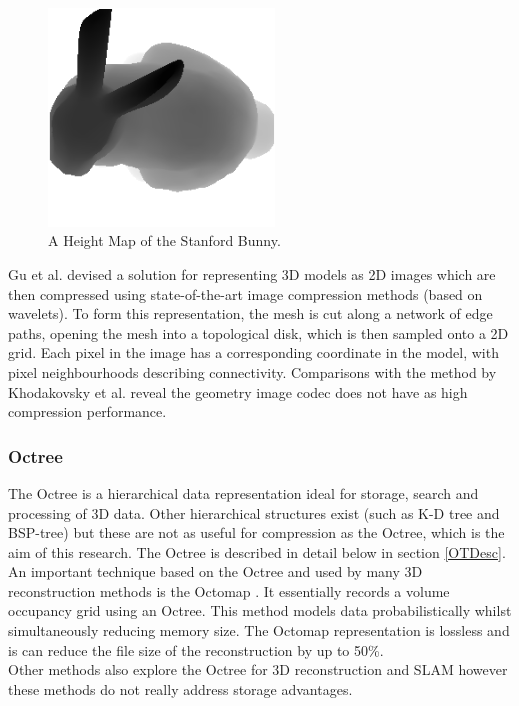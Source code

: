 \begin{figure}[!htb]
\centering
\includegraphics[width=6cm]{images/literature/HeightMap}
\caption{A Height Map of the Stanford Bunny.}
\label{fig:HeightMapExample}
\end{figure}

Gu et al. \cite{Gu02Geometry} devised a solution for representing 3D models as 2D images which are then compressed using state-of-the-art image compression methods (based on wavelets). To form this representation, the mesh is cut along a network of edge paths, opening the mesh into a topological disk, which is then sampled onto a 2D grid. Each pixel in the image has a corresponding coordinate in the model, with pixel neighbourhoods describing connectivity. Comparisons with the method by Khodakovsky et al. reveal the geometry image codec does not have as high compression performance. \\


\subsubsection{Octree}

The Octree is a hierarchical data representation ideal for storage, search and processing of 3D data. Other hierarchical structures exist (such as K-D tree and BSP-tree) \cite{Samet06Foundations} but these are not as useful for compression as the Octree, which is the aim of this research. The Octree is described in detail below in section \ref{OTDesc}. An important technique based on the Octree and used by many 3D reconstruction methods is the Octomap \cite{Wurm10Octomap}. It essentially records a volume occupancy grid using an Octree. This method models data probabilistically whilst simultaneously reducing memory size. The Octomap representation is lossless and is can reduce the file size of the reconstruction by up to 50\%. \\

Other methods also explore the Octree for 3D reconstruction and SLAM \cite{Fournier07Mapping,Meagher82Geometric,Fairfield07Real} however these methods do not really address storage advantages. 



